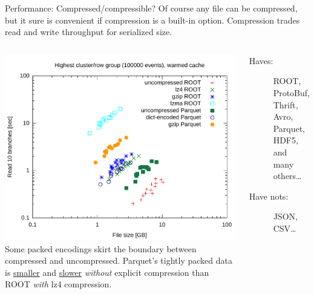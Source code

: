 \documentclass[aspectratio=169]{beamer}
\begin{document}
\begin{frame}{Performance: Compressed/compressible?}
\vspace{0.35 cm}
Of course any file can be compressed, but it sure is convenient if compression is a built-in option. Compression trades read and write throughput for serialized size.

\begin{columns}
\includegraphics[width=\linewidth]{root-parquet-size-throughput.pdf}
\small
Some packed encodings skirt the boundary between compressed and uncompressed. Parquet's tightly packed data is \underline{smaller} and \underline{slower} {\it without} explicit compression than ROOT {\it with} lz4 compression.

\vspace{0.25 cm}
\normalsize
\begin{description}
\item[Haves:] ROOT, ProtoBuf, Thrift, Avro, Parquet, HDF5, and many others\ldots
\item[Have nots:] JSON, CSV\ldots
\end{description}
\end{columns}
\end{frame}
\end{document}
